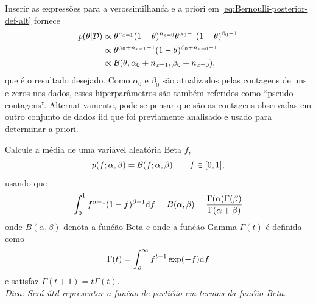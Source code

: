 \begin{exenumerate}
\begin{solution}
        Inserir as express\~oes para a verossimilhan\'ca e a priori em
        \eqref{eq:Bernoulli-posterior-def-alt} fornece
        \begin{align}
            p(\theta | \mathcal{D}) &\propto \theta^{n_{x=1}}(1-\theta)^{n_{x=0}}\theta^{\alpha_0-1}(1-\theta)^{\beta_0-1}\\
            & \propto \theta^{\alpha_0+n_{x=1}-1}(1-\theta)^{\beta_0+n_{x=0}-1}\\
            & \propto \mathcal{B}(\theta, \alpha_0+n_{x=1}, \beta_0+n_{x=0}),
        \end{align}
        que \'e o resultado desejado. Como $\alpha_0$ e $\beta_0$ s\~ao
        atualizados pelas contagens de uns e zeros nos dados, esses
        hiperpar\^ametros s\~ao tamb\'em referidos como
        ``pseudo-contagens''. Alternativamente, pode-se pensar que s\~ao as
        contagens observadas em outro conjunto de dados iid que foi
        previamente analisado e usado para determinar a priori.
    \end{solution}
    
    
    
    \item \label{q:mean-beta-var-alt} Calcule a m\'edia de uma vari\'avel aleat\'oria Beta $f$,
    \begin{equation}
        p(f; \alpha, \beta) =  \mathcal{B}(f ; \alpha, \beta) \quad \quad f \in [0,1],
    \end{equation}
    usando que
    \begin{equation}
        \int_0^1 f^{\alpha-1} (1-f)^{\beta-1} \mathrm{d} f = B(\alpha, \beta) = \frac{\Gamma(\alpha)\Gamma(\beta)}{\Gamma(\alpha+\beta)}
    \end{equation}
    onde $ B(\alpha, \beta)$ denota a fun\'c\~ao Beta e onde a fun\'c\~ao Gamma $\Gamma(t)$ \'e definida como
    \begin{equation}
        \Gamma(t) = \int_o^\infty f^{t-1} \exp(-f) \mathrm{d} f
    \end{equation}
    e satisfaz $\Gamma(t+1) = t \Gamma(t)$.\\
    \emph{Dica: Ser\'a \'util representar a fun\'c\~ao de parti\'c\~ao em termos da fun\'c\~ao Beta.}
    

\end{exenumerate}
